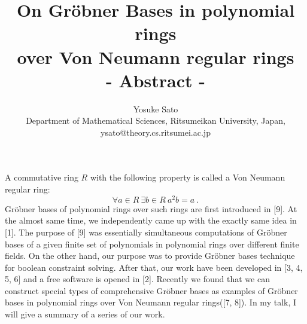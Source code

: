 \documentclass[12pt,a4paper]{article}
\begin{document}
  \title{On Gr\"obner Bases in polynomial rings\\
over Von Neumann regular rings\\
- Abstract -}
  \author{Yosuke Sato \\
Department of Mathematical Sciences, Ritsumeikan University, Japan, \\
ysato@theory.cs.ritsumei.ac.jp}
  \date{}
  \maketitle
\noindent
A commutative ring $R$ with the following property is called 
a Von Neumann regular ring:
\[ \forall a \in R\: \exists b \in R\: a^2b = a\:. \]
Gr\"{o}bner bases of polynomial rings over such rings are first introduced 
in [9]. At the almost same time, we independently came up with the exactly
same idea in [1].
The purpose of [9] was essentially simultaneous computations of 
Gr\"{o}bner bases of a given finite set of polynomials 
in polynomial rings over different finite fields.
On the other hand, our purpose was to provide Gr\"{o}bner bases technique
for boolean constraint solving. 
After that, our work have been developed in 
[3, 4, 5, 6] and a free software is opened in [2].
Recently we found that we can construct special types of comprehensive
Gr\"{o}bner bases as examples of Gr\"{o}bner bases in polynomial rings
over Von Neumann regular rings([7, 8]).
In my talk, I will give a summary of a series of our work.
\end{document}
